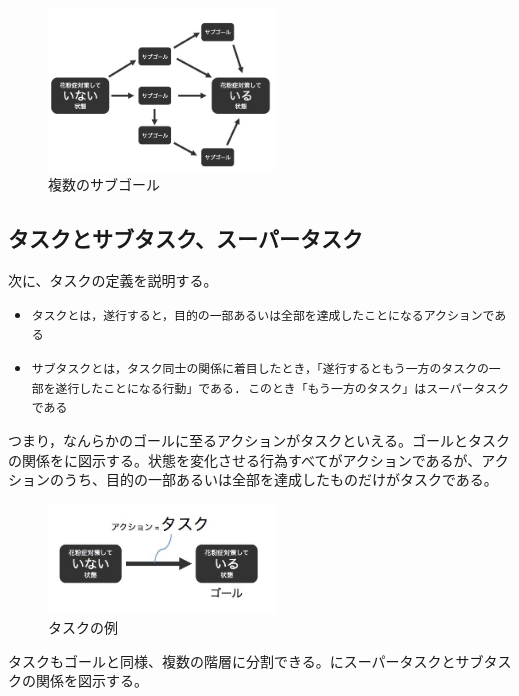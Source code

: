 \documentclass[submit,techreq]{ipsj}
\def\|{\verb|}
\begin{document}
\begin{figure}[tb]
\includegraphics[width=6cm, bb=0 0 450 400]{many_sub_goals.jpg}
\caption{複数のサブゴール}
\label{fig:many_sub_goals}
\end{figure}



%3.2
\subsection{タスクとサブタスク、スーパータスク}
\label{task_and_goal}


次に、タスクの定義を説明する。

\begin{itemize}

\item \|タスクとは，遂行すると，目的の一部あるいは全部を達成したことになるアクションである|
\item \|サブタスクとは，タスク同士の関係に着目したとき，「遂行するともう一方のタスクの一部を遂行したことになる行動」である. このとき「もう一方のタスク」はスーパータスクである|
\end{itemize}

つまり，なんらかのゴールに至るアクションがタスクといえる。ゴールとタスクの関係をに図示する。状態を変化させる行為すべてがアクションであるが、アクションのうち、目的の一部あるいは全部を達成したものだけがタスクである。


\begin{figure}[tb]
\includegraphics[width=6cm, bb=0 0 400 300]{action_task.jpg}
\caption{タスクの例}
\label{fig:action_task}
\end{figure}


タスクもゴールと同様、複数の階層に分割できる。にスーパータスクとサブタスクの関係を図示する。
\end{document}
